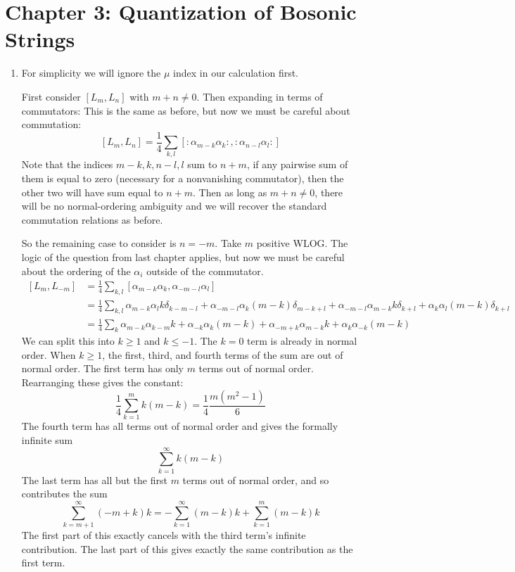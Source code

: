 \documentclass[11pt, class=article, crop=false]{standalone}
\begin{document}
	

	\section*{Chapter 3: Quantization of Bosonic Strings} %
	\label{sec:chapter_3_quantization_of_bosonic_strings}
	
	\begin{enumerate}
		\item 
		For simplicity we will ignore the $\mu$ index in our calculation first.
		
   		First consider $[L_m, L_n]$ with $m+n \neq 0$. Then expanding in terms of commutators: This is the same as before, but now we must be careful about commutation: 
   	 \[
   	 		[L_m, L_n ] = \frac14 \sum_{k, l} [:\alpha_{m-k} \alpha_k: , :\alpha_{n-l} \alpha_l: ] 
   	 \]
   	 Note that the indices $m-k, k, n-l, l$ sum to $n+m$, if any pairwise sum of them is equal to zero (necessary for a nonvanishing commutator), then the other two will have sum equal to $n+m$. Then as long as $m+n \neq 0$, there will be no normal-ordering ambiguity and we will recover the standard commutation relations as before. 
	 
	 So the remaining case to consider is $n = -m$. Take $m$ positive WLOG. The logic of the question from last chapter applies, but now we must be careful about the ordering of the $\alpha_i$ outside of the commutator. 
	 \begin{equation}
	 	\begin{aligned}
	 		\, [L_m, L_{-m}] &= \frac14 \sum_{k, l} [\alpha_{m-k} \alpha_k, \alpha_{-m-l} \alpha_l]\\
			&= \frac14 \sum_{k, l} \alpha_{m-k} \alpha_l k \delta_{k-m-l}
				+ \alpha_{-m-l} \alpha_k (m-k) \delta_{m-k+l} 
				+ \alpha_{-m-l} \alpha_{m-k} k \delta_{k+l}
				+ \alpha_k \alpha_l (m-k) \delta_{k+l}\\
			&= \frac14 \sum_k \alpha_{m-k} \alpha_{k-m} k
				+ \alpha_{-k} \alpha_k (m-k)
				+ \alpha_{-m+k} \alpha_{m-k} k
				+ \alpha_{k} \alpha_{-k} (m-k)
	 	\end{aligned}
	 \end{equation}
	 We can split this into $k \geq 1$ and $k \leq -1$. The $k = 0$ term is already in normal order. When $k \geq 1$, the first, third, and fourth terms of the sum are out of normal order. The first term has only $m$ terms out of normal order. Rearranging these gives the constant:
	 \begin{equation*}
	 	\frac14 \sum_{k=1}^m k (m-k) = \frac14 \frac{m (m^2 - 1)}{6}
	 \end{equation*}
	 The fourth term has all terms out of normal order and gives the formally infinite sum
	 \[
	 	\sum_{k=1}^\infty k(m-k)
	 \]
	 The last term has all but the first $m$ terms out of normal order, and so contributes the sum
	 \[
	 	\sum_{k=m+1}^\infty (-m + k) k = - \sum_{k=1}^\infty (m-k) k + \sum_{k=1}^m (m-k) k
	 \]
	 The first part of this exactly cancels with the third term's infinite contribution. The last part of this gives exactly the same contribution as the first term. 
	 

\end{enumerate}
\end{document}
